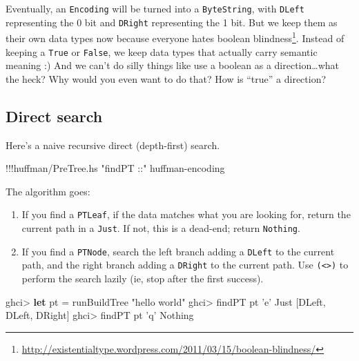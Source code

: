 \documentclass[]{article}
\newenvironment{Shaded}{}{}
\newcommand{\KeywordTok}[1]{\textcolor[rgb]{0.00,0.44,0.13}{\textbf{{#1}}}}
\newcommand{\DataTypeTok}[1]{\textcolor[rgb]{0.56,0.13,0.00}{{#1}}}
\newcommand{\CharTok}[1]{\textcolor[rgb]{0.25,0.44,0.63}{{#1}}}
\newcommand{\StringTok}[1]{\textcolor[rgb]{0.25,0.44,0.63}{{#1}}}
\newcommand{\FunctionTok}[1]{\textcolor[rgb]{0.02,0.16,0.49}{{#1}}}
\newcommand{\NormalTok}[1]{{#1}}
\renewcommand{\href}[2]{#2\footnote{\url{#1}}}
\begin{document}
Eventually, an \texttt{Encoding} will be turned into a
\texttt{ByteString}, with \texttt{DLeft} representing the 0 bit and
\texttt{DRight} representing the 1 bit. But we keep them as their own
data types now because everyone hates
\href{http://existentialtype.wordpress.com/2011/03/15/boolean-blindness/}{boolean
blindness}. Instead of keeping a \texttt{True} or \texttt{False}, we
keep data types that actually carry semantic meaning :) And we can't do
silly things like use a boolean as a direction\ldots{}what the heck? Why
would you even want to do that? How is ``true'' a direction?

\subsection{Direct search}\label{direct-search}

Here's a naive recursive direct (depth-first) search.

\begin{Shaded}
\begin{Highlighting}[]
\FunctionTok{!!!}\NormalTok{huffman}\FunctionTok{/}\NormalTok{PreTree.hs }\StringTok{"findPT ::"} \NormalTok{huffman}\FunctionTok{-}\NormalTok{encoding}
\end{Highlighting}
\end{Shaded}

The algorithm goes:

\begin{enumerate}
\def\labelenumi{\arabic{enumi}.}
\item
  If you find a \texttt{PTLeaf}, if the data matches what you are
  looking for, return the current path in a \texttt{Just}. If not, this
  is a dead-end; return \texttt{Nothing}.
\item
  If you find a \texttt{PTNode}, search the left branch adding a
  \texttt{DLeft} to the current path, and the right branch adding a
  \texttt{DRight} to the current path. Use
  \texttt{(\textless{}\textbar{}\textgreater{})} to perform the search
  lazily (ie, stop after the first success).
\end{enumerate}

\begin{Shaded}
\begin{Highlighting}[]
\NormalTok{ghci}\FunctionTok{>} \KeywordTok{let} \NormalTok{pt }\FunctionTok{=} \NormalTok{runBuildTree }\StringTok{"hello world"}
\NormalTok{ghci}\FunctionTok{>} \NormalTok{findPT pt }\CharTok{'e'}
\DataTypeTok{Just} \NormalTok{[}\DataTypeTok{DLeft}\NormalTok{, }\DataTypeTok{DLeft}\NormalTok{, }\DataTypeTok{DRight}\NormalTok{]}
\NormalTok{ghci}\FunctionTok{>} \NormalTok{findPT pt }\CharTok{'q'}
\DataTypeTok{Nothing}
\end{Highlighting}
\end{Shaded}
\end{document}
